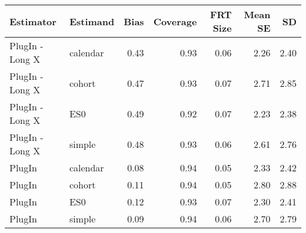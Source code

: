 \captionsetup[table]{labelformat=empty,skip=1pt}
\begin{longtable}{llrrrrr}
\toprule
Estimator & Estimand & Bias & Coverage & FRT Size & Mean SE & SD \\ 
\midrule
PlugIn - Long X & calendar & 0.43 & 0.93 & 0.06 & 2.26 & 2.40 \\ 
PlugIn - Long X & cohort & 0.47 & 0.93 & 0.07 & 2.71 & 2.85 \\ 
PlugIn - Long X & ES0 & 0.49 & 0.92 & 0.07 & 2.23 & 2.38 \\ 
PlugIn - Long X & simple & 0.48 & 0.93 & 0.06 & 2.61 & 2.76 \\ 
PlugIn & calendar & 0.08 & 0.94 & 0.05 & 2.33 & 2.42 \\ 
PlugIn & cohort & 0.11 & 0.94 & 0.05 & 2.80 & 2.88 \\ 
PlugIn & ES0 & 0.12 & 0.93 & 0.07 & 2.30 & 2.41 \\ 
PlugIn & simple & 0.09 & 0.94 & 0.06 & 2.70 & 2.79 \\ 
 \bottomrule
\end{longtable}

